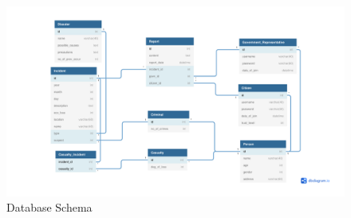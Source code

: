 \begin{figure}[H]
    \centering
    \includegraphics[width=\textwidth]{images/schema.pdf}
    \caption{Database Schema}
    \label{fig:schema}
\end{figure}

